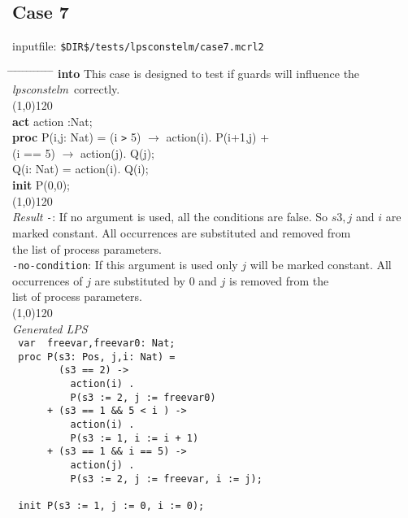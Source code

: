 \index{}\documentclass[a4paper,10pt]{article}
\theoremstyle{plain}
\theoremstyle{definition}
\newcommand{\tool}{\textit{lpsconstelm}}
\newcommand{\pps}{process parameters}
\newcommand{\ti}{\textit}
\newcommand{\tb}{\textbf}
\newcommand{\tabw}{\hspace*{15.mm} \= \hspace*{20.mm} \= \hspace*{5.mm} \= \hspace*{5.mm} \= \hspace*{5.mm} \= \hspace*{5.mm}  \= \hspace*{5.mm}  \= \hspace*{5.mm}  \= \hspace*{5.mm} \= \hspace*{5.mm} \= \hspace*{5.mm}  \= \hspace*{5.mm}  \= \hspace*{5.mm}\kill}
\begin{document}
\subsection*{Case 7}
inputfile: \verb"$DIR$/tests/lpsconstelm/case7.mcrl2"
\begin{tabbing}
\tabw
\tb{into} \> This case is designed to test if guards will influence the \tool\ correctly.\\
\line(1,0){120}\\
\tb{act}  \> action :Nat;\\
\tb{proc} \> P(i,j: Nat) =  \>  (i \verb">" 5) $\rightarrow$ action(i). P(i+1,j) +\\
          \>                \> (i == 5)        $\rightarrow$ action(j). Q(j);\\
          \> Q(i: Nat)   = \>                                action(i). Q(i);\\

\tb{init} \>  P(0,0);\\
\line(1,0){120}\\
\ti{Result} \> \verb"-": \> \> If no argument is used, all the conditions are false. So $s3, j$ and $i$ are \\
\> \> \>  marked constant. All occurrences are substituted and removed from \\
\> \> \> the list of \pps .\\
\> \verb"-no-condition": \> \> If this argument is used only $j$ will be marked constant. All \\
\> \> \> occurrences of $j$ are substituted by 0 and $j$ is removed from the \\
\> \> \> list of \pps .\\
\line(1,0){120}\\
\ti{Generated LPS} \\
\>  \verb" var  freevar,freevar0: Nat;"\\
\>  \verb" proc P(s3: Pos, j,i: Nat) = "\\
\>  \verb"        (s3 == 2) ->          "\\
\>  \verb"          action(i) .          "\\
\>  \verb"          P(s3 := 2, j := freevar0)"\\
\>  \verb"      + (s3 == 1 && 5 < i ) ->      "\\
\>  \verb"          action(i) .               "\\
\>  \verb"          P(s3 := 1, i := i + 1)  "\\
\>  \verb"      + (s3 == 1 && i == 5) ->   "\\
\>  \verb"          action(j) .          "\\
\>  \verb"          P(s3 := 2, j := freevar, i := j);"\\
\>  \verb"                 "\\
\>  \verb" init P(s3 := 1, j := 0, i := 0);"\\
\end{tabbing}
\newpage
\end{document}
